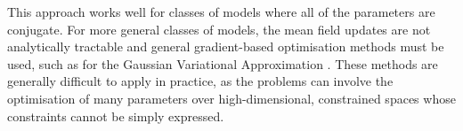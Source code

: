This approach works well for classes of models where all of the parameters are conjugate. For more general
classes of models, the mean field updates are not analytically tractable and general gradient-based optimisation
methods must be used, such as for the Gaussian Variational Approximation \cite{Ormerod2012}. These methods are
generally difficult to apply in practice, as the problems can involve the optimisation of many parameters over
high-dimensional, constrained spaces whose constraints cannot be simply expressed.











